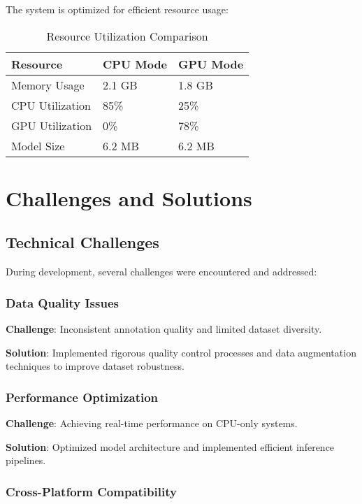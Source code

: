 \documentclass[12pt,a4paper]{article}
\begin{document}
The system is optimized for efficient resource usage:

\begin{table}[H]
\centering
\begin{tabular}{|l|l|l|}
\hline
\textbf{Resource} & \textbf{CPU Mode} & \textbf{GPU Mode} \\
\hline
Memory Usage & 2.1 GB & 1.8 GB \\
CPU Utilization & 85\% & 25\% \\
GPU Utilization & 0\% & 78\% \\
Model Size & 6.2 MB & 6.2 MB \\
\hline
\end{tabular}
\caption{Resource Utilization Comparison}
\end{table}

\section{Challenges and Solutions}

\subsection{Technical Challenges}

During development, several challenges were encountered and addressed:

\subsubsection{Data Quality Issues}

\textbf{Challenge}: Inconsistent annotation quality and limited dataset diversity.

\textbf{Solution}: Implemented rigorous quality control processes and data augmentation techniques to improve dataset robustness.

\subsubsection{Performance Optimization}

\textbf{Challenge}: Achieving real-time performance on CPU-only systems.

\textbf{Solution}: Optimized model architecture and implemented efficient inference pipelines.

\subsubsection{Cross-Platform Compatibility}
\end{document}
